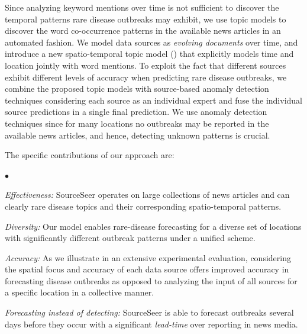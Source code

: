 \documentclass[twoside,leqno,twocolumn]{article}
\newcommand{\squishlist}{
   \begin{list}{$\bullet$}
    {
      \setlength{\itemsep}{0pt}
      \setlength{\parsep}{3pt}
      \setlength{\topsep}{3pt}
      \setlength{\partopsep}{0pt}
      \setlength{\leftmargin}{1.5em}
      \setlength{\labelwidth}{1em}
      \setlength{\labelsep}{0.5em} } }
\newcommand{\squishend}{
    \end{list}  }
\newcommand{\fullmodel}{{{\sf SourceSeer}}\xspace}
\begin{document}
Since analyzing keyword mentions over time is not sufficient to discover the temporal patterns rare disease outbreaks may exhibit, we use topic models to discover the word co-occurrence patterns in the available news articles in an automated fashion. We model data sources as {\em evolving documents} over time, and introduce a new spatio-temporal topic model () that explicitly models time and location jointly with word mentions. To exploit the fact that different sources exhibit different levels of accuracy when predicting rare disease outbreaks, we combine the proposed topic models with source-based anomaly detection techniques considering each source as an individual expert and fuse the individual source predictions in a single final prediction. We use anomaly detection techniques since for many locations no outbreaks may be reported in the available news articles, and hence, detecting unknown patterns is crucial.

The specific contributions of our approach are:
\squishlist
\item {\em Effectiveness:} \fullmodel operates on large collections of news articles and can clearly rare disease topics and their corresponding spatio-temporal patterns.
\item {\em Diversity:} Our model enables rare-disease forecasting for a diverse set of locations with significantly different outbreak patterns under a unified scheme. 
\item {\em Accuracy:} As we illustrate in an extensive experimental evaluation, considering the spatial focus and accuracy of each data source offers improved accuracy in forecasting disease outbreaks as opposed to analyzing the input of all sources for a specific location in a collective manner. 
\item{\em Forecasting instead of detecting:} \fullmodel is able to forecast outbreaks several days before they occur with a significant {\em lead-time} over reporting in news media. 
\squishend
\end{document}
